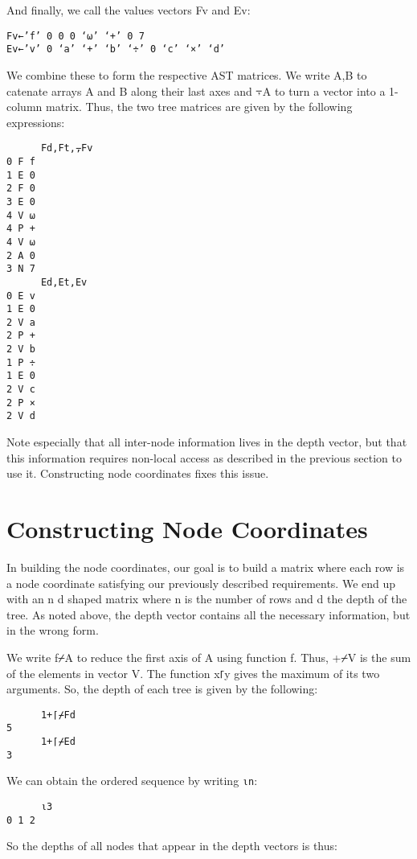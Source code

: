 \documentclass[pldi]{sigplanconf-pldi15}
\begin{document}
And finally, we call the values vectors Fv and Ev:

\begin{verbatim}
Fv←’f’ 0 0 0 ‘⍵’ ‘+’ 0 7
Ev←’v’ 0 ‘a’ ‘+’ ‘b’ ‘÷’ 0 ‘c’ ‘×’ ‘d’
\end{verbatim}

We combine these to form the respective AST matrices. We write A,B to catenate arrays A and B along their 
last axes and ⍪A to turn a vector into a 1-column matrix. Thus, the two tree matrices are given by the 
following expressions:

\begin{verbatim}
      Fd,Ft,⍪Fv
0 F f
1 E 0
2 F 0
3 E 0
4 V ⍵
4 P +
4 V ⍵
2 A 0
3 N 7
      Ed,Et,Ev
0 E v
1 E 0
2 V a
2 P +
2 V b
1 P ÷
1 E 0
2 V c
2 P ×
2 V d
\end{verbatim}

Note especially that all inter-node information lives in the depth vector, but that this information requires 
non-local access as described in the previous section to use it. Constructing node coordinates fixes this issue.
\section{Constructing Node Coordinates}

In building the node coordinates, our goal is to build a matrix where each row is a node 
coordinate satisfying our previously described requirements. We end up with an n d 
shaped matrix where n is the number of rows and d the depth of the tree. As noted above, 
the depth vector contains all the necessary information, but in the wrong form. 

We write f⌿A to reduce the first axis of A using function f. Thus, +⌿V is the sum of the 
elements in vector V. The function x⌈y gives the maximum of its two arguments. So, the 
depth of each tree is given by the following:

\begin{verbatim}
      1+⌈⌿Fd
5
      1+⌈⌿Ed
3
\end{verbatim}

We can obtain the ordered sequence  by writing \verb;⍳n;:

\begin{verbatim}
      ⍳3
0 1 2
\end{verbatim}

So the depths of all nodes that appear in the depth vectors is thus:
\end{document}
